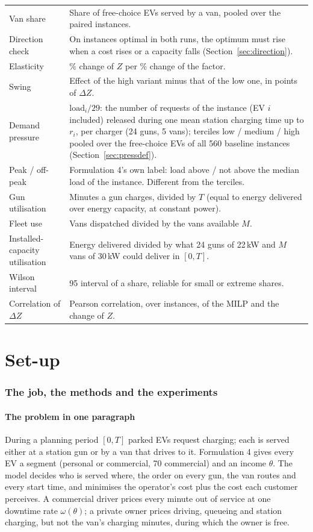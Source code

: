 \begin{xltabular}{\textwidth}{@{}>{\raggedright\arraybackslash}p{3.6cm}X@{}}
Van share & Share of free-choice EVs served by a van, pooled over the paired instances. \\
Direction check & On instances optimal in both runs, the optimum must rise when a cost rises or a capacity falls (Section~\ref{sec:direction}). \\
Elasticity & \% change of $Z$ per \% change of the factor. \\
Swing & Effect of the high variant minus that of the low one, in points of $\Delta Z$. \\
Demand pressure & $\text{load}_i/29$: the number of requests of the instance (EV $i$ included) released during one mean station charging time up to $r_i$, per charger (24 guns, 5 vans); terciles low / medium / high pooled over the free-choice EVs of all 560 baseline instances (Section~\ref{sec:pressdef}). \\
Peak / off-peak & Formulation 4's own label: load above / not above the median load of the instance. Different from the terciles. \\
Gun utilisation & Minutes a gun charges, divided by $T$ (equal to energy delivered over energy capacity, at constant power). \\
Fleet use & Vans dispatched divided by the vans available $M$. \\
Installed-capacity utilisation & Energy delivered divided by what 24 guns of 22\,kW and $M$ vans of 30\,kW could deliver in $[0,T]$. \\
Wilson interval & 95\pct{} interval of a share, reliable for small or extreme shares. \\
Correlation of $\Delta Z$ & Pearson correlation, over instances, of the MILP and the \Rt{} change of $Z$. \\
\bottomrule
\end{xltabular}

\part{Set-up}
\section{The job, the methods and the experiments}

\subsection{The problem in one paragraph}
During a planning period $[0,T]$ parked EVs request charging; each is served either at a station gun or by a van that drives to it. Formulation 4 gives every EV a segment (personal or commercial, 70\pct{} commercial) and an income $\theta$. The model decides who is served where, the order on every gun, the van routes and every start time, and minimises the operator's cost plus the cost each customer perceives. A commercial driver prices every minute out of service at one downtime rate $\omega(\theta)$; a private owner prices driving, queueing and station charging, but not the van's charging minutes, during which the owner is free.

